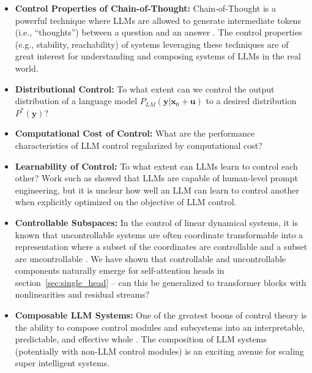 \documentclass{article} %
\begin{document}
\begin{itemize}
    \item \textbf{Control Properties of Chain-of-Thought:} Chain-of-Thought is a powerful technique where LLMs are allowed to generate intermediate tokens (i.e., ``thoughts'') between a question and an answer \citep{wei2023chainofthought}. 
    The control properties (e.g., stability, reachability) of systems leveraging these techniques are of great interest for understanding and composing systems of LLMs in the real world.  
    \item \textbf{Distributional Control:} To what extent can we control the output distribution of a language model $P_{LM}(\mathbf y | \mathbf x_0 + \mathbf u)$ to a desired distribution $P^*(\mathbf y)$?
    \item \textbf{Computational Cost of Control:} What are the performance characteristics of LLM control regularized by computational cost? 
    \item \textbf{Learnability of Control:} To what extent can LLMs learn to control each other? Work such as \cite{zhou2023large} showed that LLMs are capable of human-level prompt engineering, but it is unclear how well an LLM can learn to control another when explicitly optimized on the objective of LLM control. 
    \item \textbf{Controllable Subspaces:} In the control of linear dynamical systems, it is known that uncontrollable systems are often coordinate transformable into a representation where a subset of the coordinates are controllable and a subset are uncontrollable \cite{control_bible}. We have shown that controllable and uncontrollable components naturally emerge for self-attention heads in section~\ref{sec:single_head} -- can this be generalized to transformer blocks with nonlinearities and residual streams? 
    \item \textbf{Composable LLM Systems:} One of the greatest boons of control theory is the ability to compose control modules and subsystems into an interpretable, predictable, and effective whole \citep{lian2002network}. 
    The composition of LLM systems (potentially with non-LLM control modules) is an exciting avenue for scaling super intelligent systems.
\end{itemize}
\end{document}
